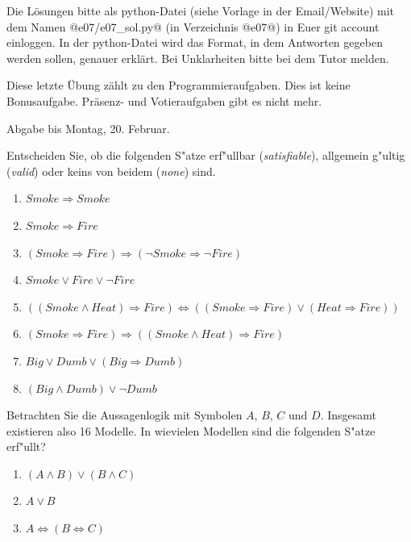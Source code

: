 

\renewcommand{\course}{Artificial Intelligence}
\renewcommand{\coursepicture}{course_ai}
\renewcommand{\coursedate}{Winter 2019}
\renewcommand{\exnum}{Exercise 7}

\exercises
{}
\exercisestitle

Die Lösungen bitte als python-Datei (siehe Vorlage in der
Email/Website) mit dem Namen @e07/e07_sol.py@ (in Verzeichnis @e07@)
in Euer git account einloggen. In der python-Datei wird das Format, in
dem Antworten gegeben werden sollen, genauer erklärt. Bei Unklarheiten
bitte bei dem Tutor melden.

Diese letzte Übung zählt zu den Programmieraufgaben. Dies ist keine
Bonusaufgabe. Präsenz- und Votieraufgaben gibt es nicht mehr.

Abgabe bis Montag, 20. Februar.


Entscheiden Sie, ob die folgenden S"atze erf"ullbar (\emph{satisfiable}),
allgemein g"ultig (\emph{valid}) oder keins von beidem (\emph{none})
sind. 

\begin{enumerate}
\item[(a)] $Smoke \Rightarrow Smoke$
\item[(b)] $Smoke \Rightarrow Fire$
\item[(c)] $(Smoke \Rightarrow Fire) \Rightarrow (\neg Smoke \Rightarrow \neg Fire)$
\item[(d)] $Smoke \vee Fire \vee \neg Fire$
\item[(e)] $((Smoke \wedge Heat) \Rightarrow Fire) \Leftrightarrow ((Smoke \Rightarrow Fire) \vee (Heat \Rightarrow Fire))$
\item[(f)] $(Smoke \Rightarrow Fire) \Rightarrow ((Smoke \wedge Heat) \Rightarrow Fire)$
\item[(g)] $Big \vee Dumb \vee (Big \Rightarrow Dumb)$
\item[(h)] $(Big \wedge Dumb) \vee \neg Dumb$
\end{enumerate}



Betrachten Sie die Aussagenlogik mit Symbolen $A$, $B$, $C$ und
$D$. Insgesamt existieren also 16 Modelle. In wievielen Modellen sind die folgenden S"atze erf"ullt?
\begin{enumerate}
\item $(A \wedge B) \vee (B \wedge  C)$
\item $A \vee B$
\item $A \Leftrightarrow (B \Leftrightarrow C)$
\end{enumerate}

